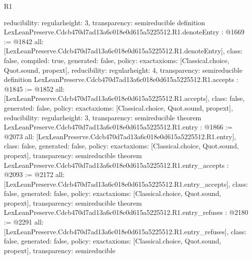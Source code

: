 \begin{lexlean}{R1}
\begin{coremodule}
{  reducibility: regular{height: 3},
  transparency: semireducible
}
definition LexLeanPreserve.Cdcb470d7ad13a6c018e0d615a5225512.R1.denoteEntry : @1669 := @1842 {
  all: [LexLeanPreserve.Cdcb470d7ad13a6c018e0d615a5225512.R1.denoteEntry],
  class: false,
  compiled: true,
  generated: false,
  policy: exact{axioms: [Classical.choice, Quot.sound, propext]},
  reducibility: regular{height: 4},
  transparency: semireducible
}
definition LexLeanPreserve.Cdcb470d7ad13a6c018e0d615a5225512.R1.accepts : @1845 := @1852 {
  all: [LexLeanPreserve.Cdcb470d7ad13a6c018e0d615a5225512.R1.accepts],
  class: false,
  generated: false,
  policy: exact{axioms: [Classical.choice, Quot.sound, propext]},
  reducibility: regular{height: 3},
  transparency: semireducible
}
theorem LexLeanPreserve.Cdcb470d7ad13a6c018e0d615a5225512.R1.entry : @1866 := @2073 {
  all: [LexLeanPreserve.Cdcb470d7ad13a6c018e0d615a5225512.R1.entry],
  class: false,
  generated: false,
  policy: exact{axioms: [Classical.choice, Quot.sound, propext]},
  transparency: semireducible
}
theorem LexLeanPreserve.Cdcb470d7ad13a6c018e0d615a5225512.R1.entry_accepts : @2093 := @2172 {
  all: [LexLeanPreserve.Cdcb470d7ad13a6c018e0d615a5225512.R1.entry_accepts],
  class: false,
  generated: false,
  policy: exact{axioms: [Classical.choice, Quot.sound, propext]},
  transparency: semireducible
}
theorem LexLeanPreserve.Cdcb470d7ad13a6c018e0d615a5225512.R1.entry_refuses : @2180 := @2291 {
  all: [LexLeanPreserve.Cdcb470d7ad13a6c018e0d615a5225512.R1.entry_refuses],
  class: false,
  generated: false,
  policy: exact{axioms: [Classical.choice, Quot.sound, propext]},
  transparency: semireducible
}


\end{coremodule}
\end{lexlean}
